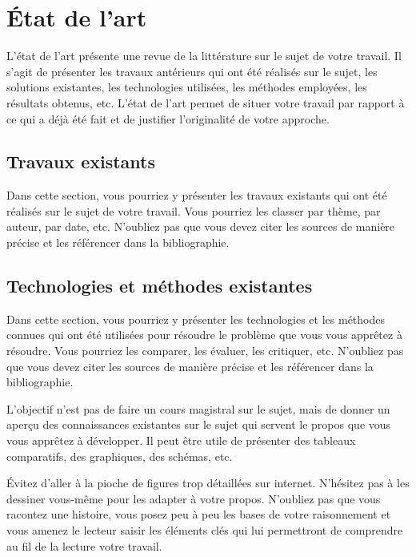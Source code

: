 \chapter{État de l'art}

L'état de l'art présente une revue de la littérature sur le sujet de votre travail. Il s'agit de présenter les travaux antérieurs qui ont été réalisés sur le sujet, les solutions existantes, les technologies utilisées, les méthodes employées, les résultats obtenus, etc. L'état de l'art permet de situer votre travail par rapport à ce qui a déjà été fait et de justifier l'originalité de votre approche.

\section{Travaux existants}

Dans cette section, vous pourriez y présenter les travaux existants qui ont été réalisés sur le sujet de votre travail. Vous pourriez les classer par thème, par auteur, par date, etc. N'oubliez pas que vous devez citer les sources de manière précise et les référencer dans la bibliographie.

\section{Technologies et méthodes existantes}

Dans cette section, vous pourriez y présenter les technologies et les méthodes connues qui ont été utilisées pour résoudre le problème que vous vous apprêtez à résoudre. Vous pourriez les comparer, les évaluer, les critiquer, etc. N'oubliez pas que vous devez citer les sources de manière précise et les référencer dans la bibliographie.

L'objectif n'est pas de faire un cours magistral sur le sujet, mais de donner un aperçu des connaissances existantes sur le sujet qui servent le propos que vous vous apprêtez à développer. Il peut être utile de présenter des tableaux comparatifs, des graphiques, des schémas, etc.

Évitez d'aller à la pioche de figures trop détaillées sur internet. N'hésitez pas à les dessiner vous-même pour les adapter à votre propos. N'oubliez pas que vous racontez une histoire, vous posez peu à peu les bases de votre raisonnement et vous amenez le lecteur saisir les éléments clés qui lui permettront de comprendre au fil de la lecture votre travail.